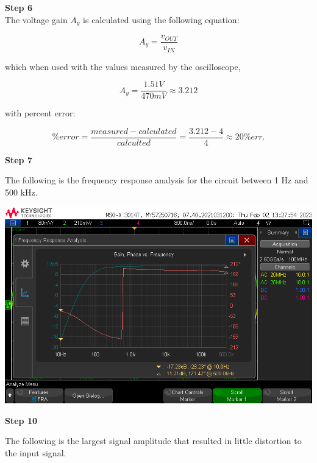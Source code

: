 \documentclass[notitlepage, 12pt]{report}  %
\begin{document}
\newpage

\textbf{Step 6}\\
\indent The voltage gain $A_y$ is calculated using the following equation:

\begin{equation}
    A_y = \frac{v_{OUT}}{v_{IN}}
\end{equation}

which when used with the values measured by the oscilloscope, 

\begin{equation}
    A_y = \frac{1.51 V}{470 mV} \approx 3.212
\end{equation}

with percent error:

\begin{equation}
    \% error = \frac{measured - calculated}{calculted} = \frac{3.212 - 4}{4} \approx 20\% err.
\end{equation}


\textbf{Step 7}

The following is the frequency response analysis for the circuit between 1 Hz and 500 kHz. \\

\begin{center}
    \includegraphics[scale=0.5]{frc.png}
\end{center}

\newpage

\textbf{Step 10}

The following is the largest signal amplitude that resulted in little distortion to the input signal.
\end{document}
